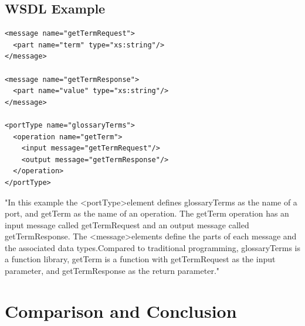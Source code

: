 \documentclass[12pt]{article}
\begin{document}
\subsection{WSDL Example}
\label{sec:wsdlexample}
\begin{lstlisting}
<message name="getTermRequest">
  <part name="term" type="xs:string"/>
</message>

<message name="getTermResponse">
  <part name="value" type="xs:string"/>
</message>

<portType name="glossaryTerms">
  <operation name="getTerm">
    <input message="getTermRequest"/>
    <output message="getTermResponse"/>
  </operation>
</portType>
\end{lstlisting}
"In this example the \textless portType\textgreater element defines glossaryTerms as the name of a port, and getTerm as the name of an operation. The getTerm operation has an input message called getTermRequest and an output message called getTermResponse. The \textless message\textgreater elements define the parts of each message and the associated data types.Compared to traditional programming, glossaryTerms is a function library, getTerm is a function with getTermRequest as the input parameter, and getTermResponse as the return parameter."\cite{wsdl}


\section{Comparison and Conclusion}
\end{document}
